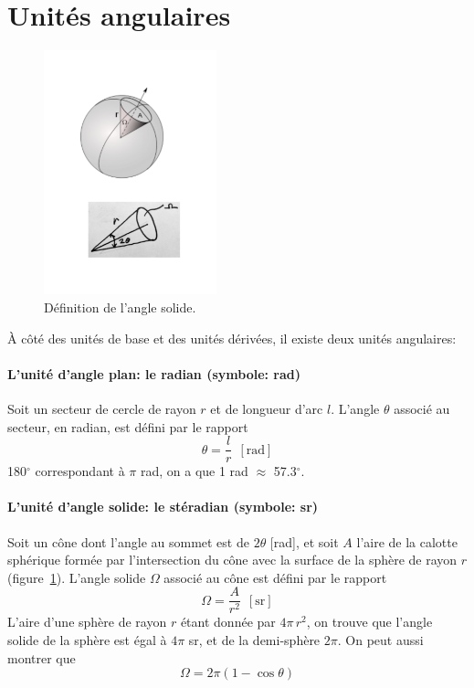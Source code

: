 \newpage

\section{Unités angulaires}

\begin{figure}
   \centering
   \includegraphics[width=5cm]{assets/figures/defAngleSolide.pdf}
   \caption{Définition de l'angle solide.}
   \label{fig:angles}
\end{figure}
À côté des unités de base et des unités dérivées, il existe deux unités angulaires:

\paragraph{L'unité d'angle plan: le radian (symbole: rad)} Soit un secteur de cercle de rayon $r$ et de longueur d'arc $l$. L'angle $\theta$ associé au secteur, en radian, est défini par le rapport
$$
\theta=\frac{l}{r}\ \ [\text{rad}]
$$
180$^\circ$ correspondant à $\pi$ rad, on a que 1 rad $\approx$ 57.3$^\circ$.

\paragraph{L'unité d'angle solide: le stéradian (symbole: sr)} Soit un cône dont l'angle au sommet est de $2\theta$ [rad], et soit $A$ l'aire de la calotte sphérique formée par l'intersection du cône avec la surface de la sphère de rayon $r$ (figure~\ref{fig:angles}). L'angle solide $\Omega$ associé au cône est défini par le rapport
$$
\Omega=\frac{A}{r^2}\ \ [\text{sr}]
$$
L'aire d'une sphère de rayon $r$ étant donnée par $4\pi\,r^2$, on trouve que l'angle solide de la sphère est égal à $4\pi$ sr, et de la demi-sphère $2\pi$. On peut aussi montrer que
$$
\Omega=2\pi(1-\cos\theta)
$$

